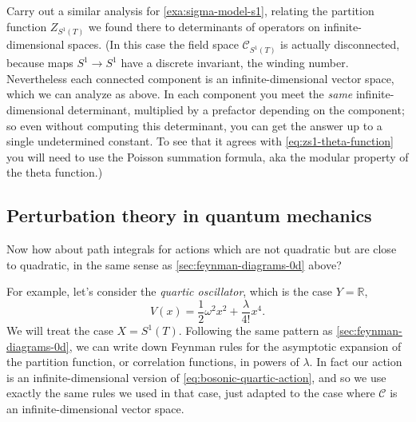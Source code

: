 \documentclass[12pt,letterpaper,reqno]{article}
\numberwithin{equation}{section}
\newcommand{\cC}{\ensuremath{\mathcal C}}
\newcommand{\R}{\ensuremath{\mathbb R}}
\newcommand{\half}{\ensuremath{\frac{1}{2}}}
\newcommand{\ti}[1]{\textit{#1}}
\begin{document}
\begin{exercise} Carry out a similar analysis for \autoref{exa:sigma-model-s1},
relating the partition function $Z_{S^1(T)}$ we found there to determinants of operators 
on infinite-dimensional spaces. (In this case the field space $\cC_{S^1(T)}$ is actually
disconnected, because maps $S^1 \to S^1$ have a discrete invariant, the winding number.
Nevertheless each connected component is an infinite-dimensional vector space,
which we can analyze as above. In each component you meet the \ti{same} infinite-dimensional
determinant, multiplied by a prefactor depending on the component; so even without
computing this determinant, you can get the answer up to a single undetermined constant.
To see that it agrees with \eqref{eq:zs1-theta-function} you will need
to use the Poisson summation formula, aka the modular property of the theta function.)
\end{exercise}


\subsection{Perturbation theory in quantum mechanics}

Now how about path integrals for actions which are not quadratic but are close
to quadratic, in the same sense as \autoref{sec:feynman-diagrams-0d} above? 

For example, let's consider
the \ti{quartic oscillator}, which is the case $Y = \R$, 
\begin{equation}
  V(x) = \half \omega^2 x^2 + \frac{\lambda}{4!} x^4.
\end{equation}
We will treat the case $X = S^1(T)$.
Following the same pattern as \autoref{sec:feynman-diagrams-0d}, 
we can write down 
Feynman rules for the asymptotic expansion of the 
partition function, or correlation functions, in 
powers of $\lambda$. In fact 
our action is an infinite-dimensional version
of \eqref{eq:bosonic-quartic-action},
and so we use exactly the same rules we used in that case, just adapted
to the case where $\cC$ is an infinite-dimensional vector space.
\end{document}
